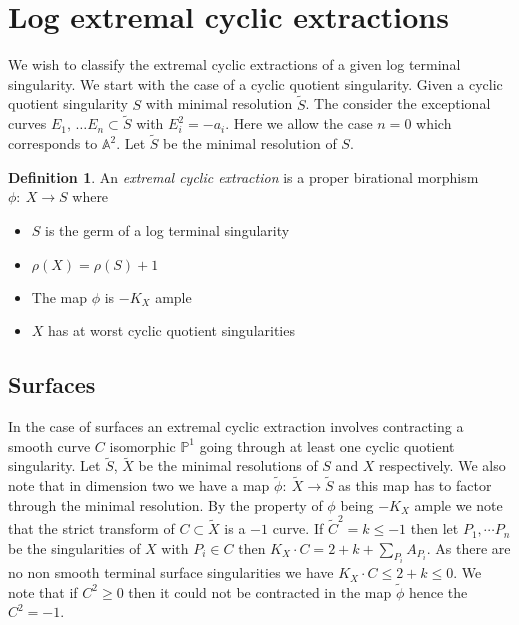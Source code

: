 \documentclass[11pt]{amsart}
\theoremstyle{definition}
\theoremstyle{definition}
\theoremstyle{definition}
\theoremstyle{definition}
\newtheorem{dfn}[thm]{Definition}
\theoremstyle{definition}
\theoremstyle{definition}
\theoremstyle{definition}
\theoremstyle{definition}
\newcommand{\mb}[1]{\mathbb{#1}}
\newcommand{\ra}{\rightarrow}
\newcommand{\wt}[1]{\widetilde{#1}}
\begin{document}
 


\section{Log extremal cyclic extractions}


We wish to classify the extremal cyclic extractions of a given log terminal singularity. We start with the case of a cyclic quotient singularity. Given a cyclic quotient singularity $S$ with minimal resolution $\wt{S}$. The consider the exceptional curves $E_1, \,  \dots E_n \subset \wt{S}$ with $E_i^2 = -a_i$. Here we allow the case $n=0$ which corresponds to $\mathbb{A}^2$. Let $\widetilde{S}$ be the minimal resolution of $S$.

\begin{dfn}
An \emph{extremal cyclic extraction} is a proper birational morphism $\phi : \: X \ra S$ where
\begin{itemize}

\item $S$ is the germ of a log terminal singularity
\item $\rho(X) = \rho(S) + 1$
\item The map $\phi$ is $-K_X$ ample
\item $X$ has at worst cyclic quotient singularities
\end{itemize}
\end{dfn}
 
 \subsection{Surfaces}
 
In the case of surfaces an extremal cyclic extraction involves contracting a smooth curve $C$ isomorphic $\mb{P}^1$ going through at least one cyclic quotient singularity. Let $\wt{S}$, $\wt{X}$ be the minimal resolutions of $S$ and $X$ respectively. We also note that in dimension two we have a map $\wt{\phi} : \: \wt{X} \ra \wt{S}$ as this map has to factor through the minimal resolution. By the property of $\phi$ being $-K_X$ ample we note that the strict transform of $C \subset \wt{X}$ is a $-1$ curve. If $\wt{C}^2 = k \le -1$ then let $P_1, \cdots P_n$ be the singularities of $X$ with $P_i \in C$ then $K_X \cdot C  = 2 + k + \sum_{P_i} A_{P_i} $. As there are no non smooth terminal surface singularities we have $K_X \cdot C \le 2+ k \leq 0$. We note that if $C^2 \geq 0$ then it could not be contracted in the map $\wt{\phi}$ hence the $C^2 = -1$.
 
\end{document}
